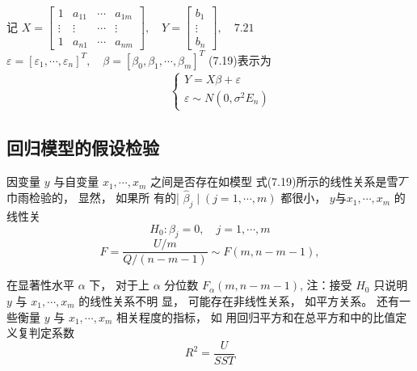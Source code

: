 记 $  X=\left[\begin{array}{cccc}1 & a_{11} & \cdots & a_{1 m} \\ \vdots & \vdots & \cdots & \vdots \\ 1 & a_{n 1} & \cdots & a_{n m}\end{array}\right], \quad Y=\left[\begin{array}{c}b_{1} \\ \vdots \\ b_{n}\end{array}\right], \quad {7 . 2 1}  $
$  \varepsilon=\left[\varepsilon_{1}, \cdots, \varepsilon_{n}\right]^{T}, \quad \beta=\left[\beta_{0}, \beta_{1}, \cdots, \beta_{m}\right]^{T}  $
(7.19)表示为
\begin{equation}
\begin{array}{l}

\qquad\left\{\begin{array}{l}
{Y}={X} {\beta}+{\varepsilon} \\
{\varepsilon} \sim {N}\left({0}, \sigma^{2} {E}_{n}\right)
\end{array}\right.
\end{array}
\end{equation}

\subsection{回归模型的假设检验}

因变量 $  y  $ 与自变量 $  x_{1}, \cdots, x_{m}  $ 之间是否存在如模型 式(7.19)所示的线性关系是雪丆巾雨检验的， 显然， 如果所 有的| $  \hat{\beta}_{j} \mid(j=1, \cdots, m)  $ 都很小， $  y 与 x_{1}, \cdots, x_{m}  $ 的线性关
\begin{equation}
H_{0}: \beta_{j}=0, \quad j=1, \cdots, m
\end{equation}
\begin{equation}
F=\frac{U / m}{Q /(n-m-1)} \sim F(m, n-m-1),
\end{equation}

在显著性水平 $  \alpha  $ 下， 对于上 $  \alpha  $ 分位数 $  {F}_{\alpha}({m}, {n}-{m}-{1})  $,
注：接受 $  {H}_{0}  $ 只说明 $  {y}  $ 与 $  {x}_{1}, \cdots, {x}_{m}  $ 的线性关系不明
显， 可能存在非线性关系， 如平方关系。  还有一些衡量 $  y  $ 与 $  x_{1}, \cdots, x_{m}  $ 相关程度的指标， 如 用回归平方和在总平方和中的比值定义复判定系数
\begin{equation}
{R}^{2}=\frac{{U}}{{S S T}}
\end{equation}

